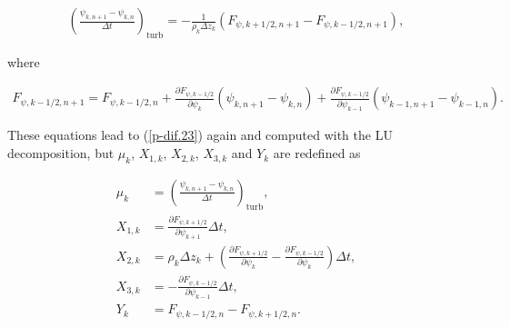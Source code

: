 \begin{eqnarray} \left(\frac{\psi_{k,n+1}-\psi_{k,n}}{\Delta t}\right)_{\text{turb}} = -\frac{1}{\rho_k\Delta z_k}\left(F_{\psi,k+1/2,n+1}-F_{\psi,k-1/2,n+1}\right), \end{eqnarray}

where

\begin{eqnarray} F_{\psi,k-1/2,n+1} = F_{\psi,k-1/2,n} + \frac{\partial F_{\psi,k-1/2}}{\partial \psi_k}(\psi_{k,n+1}-\psi_{k,n}) +  \frac{\partial F_{\psi,k-1/2}}{\partial \psi_{k-1}}(\psi_{k-1,n+1}-\psi_{k-1,n}). \end{eqnarray}

These equations lead to (\ref{p-dif.23}) again and computed with the LU decomposition, but \(\mu_k\), \(X_{1,k}\), \(X_{2,k}\), \(X_{3,k}\) and \(Y_k\) are redefined as

\begin{align}
 \mu_k &= \left(\frac{\psi_{k,n+1}-\psi_{k,n}}{\Delta t}\right)_{\text{turb}}, \\
 X_{1,k} &= \frac{\partial F_{\psi,k+1/2}}{\partial \psi_{k+1}} \Delta t, \\
 X_{2,k} &= \rho_k \Delta z_k + \left( \frac{\partial F_{\psi,k+1/2}}{\partial \psi_k} - \frac{\partial F_{\psi,k-1/2}}{\partial \psi_k} \right)\Delta t, \\
 X_{3,k} &= -\frac{\partial F_{\psi,k-1/2}}{\partial \psi_{k-1}} \Delta t, \\
 Y_k &= F_{\psi,k-1/2,n} - F_{\psi,k+1/2,n}.
\end{align}

